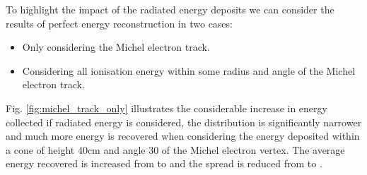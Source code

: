 To highlight the impact of the radiated energy deposits we can consider the 
results of perfect energy reconstruction in two cases:
\begin{itemize}
	\item Only considering the Michel electron track.
	\item Considering all ionisation energy within some radius and angle of the 
		Michel electron track.
\end{itemize}
Fig. \ref{fig:michel_track_only} illustrates the considerable increase in energy
collected if radiated energy is considered, the distribution is significantly
narrower and much more energy is recovered when considering the energy deposited
within a cone of height 40cm and angle 30 \textdegree of the Michel electron
vertex. The average energy recovered is increased from  to
 and the spread is reduced from  to
.
